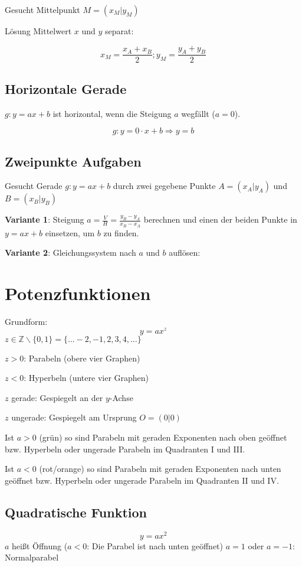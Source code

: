 \begin{multicols}{2}
Gesucht Mittelpunkt $M=(x_M|y_M)$

Lösung Mittelwert $x$ und $y$ separat:

$$x_M = \frac{x_A+x_B}2; y_M=\frac{y_A+y_B}2$$

\subsection{Horizontale Gerade}

$g: y=ax+b$ ist horizontal, wenn die Steigung $a$ wegfällt ($a=0$).

$$g:  y=0\cdot{}x+b \Rightarrow y=b$$

\subsection{Zweipunkte Aufgaben}
Gesucht Gerade $g: y=ax+b$ durch zwei gegebene Punkte $A=(x_A|y_A)$
und $B=(x_B|y_B)$

\textbf{Variante 1}: Steigung $a = \frac{V}H
= \frac{y_B-y_A}{x_B-x_A}$ berechnen und einen der beiden Punkte in
$y=ax+b$ einsetzen, um $b$ zu finden.

\textbf{Variante 2}: Gleichungssystem nach $a$ und $b$ auf\/lösen:

\hrulefill

\section{Potenzfunktionen}
Grundform:
$$y=ax^z$$
$z\in\mathbb{Z}\backslash\{0,1\} = \{...-2, -1, 2, 3, 4, ...\}$

$z>0$: Parabeln (obere vier Graphen)

$z<0$: Hyperbeln (untere vier Graphen)

$z$ gerade: Gespiegelt an der $y$-Achse

$z$ ungerade: Gespiegelt am Ursprung $O=(0|0)$

Ist $a>0$ (grün) so sind Parabeln mit geraden Exponenten nach oben geöffnet bzw. Hyperbeln oder ungerade
Parabeln im Quadranten I und III.

Ist $a<0$ (rot/orange) so sind Parabeln mit geraden Exponenten nach unten geöffnet bzw. Hyperbeln oder ungerade
Parabeln im Quadranten II und IV.


\subsection{Quadratische Funktion}
$$y=ax^2$$
$a$ heißt Öffnung ($a<0$: Die Parabel ist nach unten geöffnet)
$a=1$ oder $a=-1$: Normalparabel
\end{multicols}

